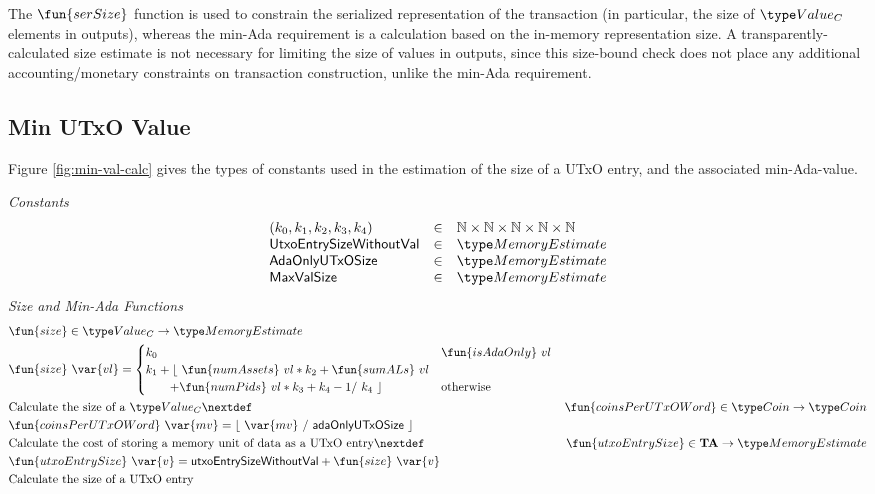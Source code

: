     The $\fun{serSize}$ function is used to constrain
    the serialized representation of the transaction (in particular, the size
    of $\Value_C$ elements in outputs), whereas the min-Ada requirement is a calculation based on
    the in-memory representation size. A transparently-calculated size estimate
    is not necessary for limiting the size of values in outputs, since this size-bound
    check does not place any additional accounting/monetary constraints on transaction construction,
    unlike the min-Ada requirement.

\subsection{Min UTxO Value}
\label{sec:min-value}

Figure \ref{fig:min-val-calc} gives the types of constants used in the estimation
of the size of a UTxO entry, and the associated min-Ada-value.

\begin{figure*}[h]
  \emph{Constants}
  \begin{equation*}
    \begin{array}{lcl}
      (k_0, k_1, k_2, k_3, k_4) & \in & \N \times \N \times \N \times \N \times \N \\
      \mathsf{UtxoEntrySizeWithoutVal} & \in & \MemoryEstimate \\
      \mathsf{AdaOnlyUTxOSize} & \in & \MemoryEstimate \\
      \mathsf{MaxValSize} & \in & \MemoryEstimate \\
    \end{array}
  \end{equation*}
  \emph{Size and Min-Ada Functions}
  \begin{align*}
    & \fun{size} \in \Value_C \to \MemoryEstimate \\
    & \fun{size}~\var{vl} =
    \begin{cases}
      k_0 & \fun{isAdaOnly}~vl\\
      k_1 + \lfloor~ \fun{numAssets}~vl * k_2 + \fun{sumALs}~vl & \\
      ~~~~~~ + \fun{numPids}~vl * k_3 + k_4 - 1 /~ k_4~\rfloor & \text{otherwise} \\
    \end{cases} \\
    & \text{Calculate the size of a $\Value_C$}
    \nextdef
    & \fun{coinsPerUTxOWord}\in \Coin \to \Coin \\
    & \fun{coinsPerUTxOWord}~\var{mv} = \lfloor~ \var{mv}~/~ \mathsf{adaOnlyUTxOSize}~ \rfloor \\
    & \text{Calculate the cost of storing a memory unit of data as a UTxO entry}
    \nextdef
    & \fun{utxoEntrySize} \in \ValMonoid \to \MemoryEstimate \\
    & \fun{utxoEntrySize}~\var{v} = \mathsf{utxoEntrySizeWithoutVal} + \fun{size}~\var{v} \\
    & \text{Calculate the size of a UTxO entry}
\end{align*}
\caption{Value Size Calculation}
\label{fig:min-val-calc}
\end{figure*}

